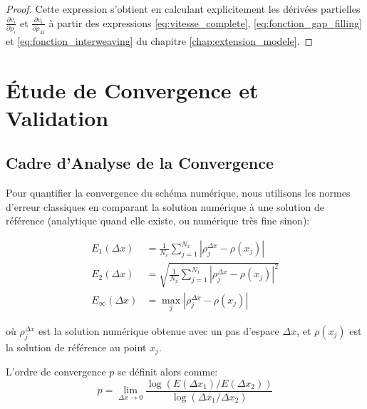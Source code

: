 \begin{proof}
Cette expression s'obtient en calculant explicitement les dérivées partielles $\frac{\partial v_i}{\partial \rho_i}$ et $\frac{\partial v_i}{\partial \rho_M}$ à partir des expressions \eqref{eq:vitesse_complete}, \eqref{eq:fonction_gap_filling} et \eqref{eq:fonction_interweaving} du chapitre \ref{chap:extension_modele}.
\end{proof}

\section{Étude de Convergence et Validation}
\label{sec:convergence_validation}

\subsection{Cadre d'Analyse de la Convergence}
\label{subsec:cadre_convergence}

Pour quantifier la convergence du schéma numérique, nous utilisons les normes d'erreur classiques en comparant la solution numérique à une solution de référence (analytique quand elle existe, ou numérique très fine sinon):

\begin{align}
E_1(\Delta x) &= \frac{1}{N_x} \sum_{j=1}^{N_x} |\rho_j^{\Delta x} - \rho(x_j)|\\
E_2(\Delta x) &= \sqrt{\frac{1}{N_x} \sum_{j=1}^{N_x} |\rho_j^{\Delta x} - \rho(x_j)|^2}\\
E_{\infty}(\Delta x) &= \max_{j} |\rho_j^{\Delta x} - \rho(x_j)|
\end{align}

où $\rho_j^{\Delta x}$ est la solution numérique obtenue avec un pas d'espace $\Delta x$, et $\rho(x_j)$ est la solution de référence au point $x_j$.

L'ordre de convergence $p$ se définit alors comme:
\begin{equation}
p = \lim_{\Delta x \to 0} \frac{\log(E(\Delta x_1)/E(\Delta x_2))}{\log(\Delta x_1/\Delta x_2)}
\end{equation}


